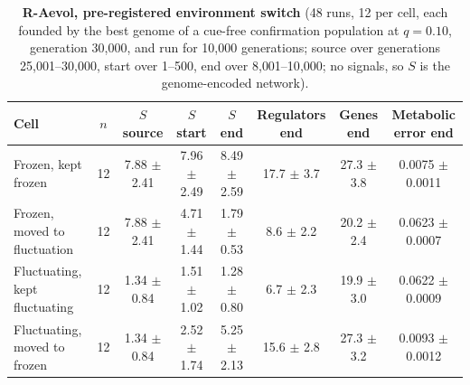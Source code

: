 \begin{table}[!ht]\small
\caption{\textbf{R-Aevol, pre-registered environment switch} (48 runs, 12 per cell, each founded by the best genome of a cue-free confirmation population at $q=0.10$, generation 30{,}000, and run for 10{,}000 generations; source over generations 25{,}001--30{,}000, start over 1--500, end over 8{,}001--10{,}000; no signals, so $S$ is the genome-encoded network).}
\begin{tabular}{@{}lccccccc@{}}\toprule
Cell & $n$ & $S$ source & $S$ start & $S$ end & Regulators end & Genes end & Metabolic error end\\\midrule
Frozen, kept frozen & 12 & 7.88 $\pm$ 2.41 & 7.96 $\pm$ 2.49 & 8.49 $\pm$ 2.59 & 17.7 $\pm$ 3.7 & 27.3 $\pm$ 3.8 & 0.0075 $\pm$ 0.0011\\
Frozen, moved to fluctuation & 12 & 7.88 $\pm$ 2.41 & 4.71 $\pm$ 1.44 & 1.79 $\pm$ 0.53 & 8.6 $\pm$ 2.2 & 20.2 $\pm$ 2.4 & 0.0623 $\pm$ 0.0007\\
Fluctuating, kept fluctuating & 12 & 1.34 $\pm$ 0.84 & 1.51 $\pm$ 1.02 & 1.28 $\pm$ 0.80 & 6.7 $\pm$ 2.3 & 19.9 $\pm$ 3.0 & 0.0622 $\pm$ 0.0009\\
Fluctuating, moved to frozen & 12 & 1.34 $\pm$ 0.84 & 2.52 $\pm$ 1.74 & 5.25 $\pm$ 2.13 & 15.6 $\pm$ 2.8 & 27.3 $\pm$ 3.2 & 0.0093 $\pm$ 0.0012\\
\bottomrule\end{tabular}\end{table}
